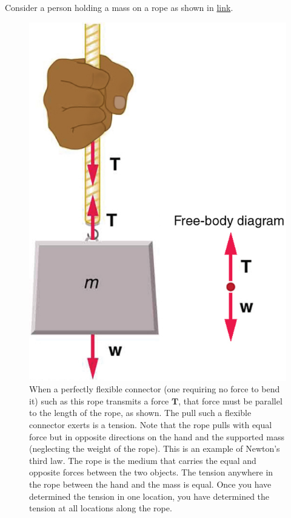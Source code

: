 \documentclass[
]{book}
\begin{document}
Consider a person holding a mass on a rope as shown in
\protect\hyperlink{import-auto-id2715102}{link}.

\begin{figure}
\hypertarget{import-auto-id2715102}{%
\centering
\includegraphics{images/Figure 04_05_04.jpg}
\caption{When a perfectly flexible connector (one requiring no force to bend
it) such as this rope transmits a force \(\textbf{T}{}\), that force must
be parallel to the length of the rope, as shown. The pull such a
flexible connector exerts is a tension. Note that the rope pulls with
equal force but in opposite directions on the hand and the supported
mass (neglecting the weight of the rope). This is an example of Newton's
third law. The rope is the medium that carries the equal and opposite
forces between the two objects. The tension anywhere in the rope between
the hand and the mass is equal. Once you have determined the tension in
one location, you have determined the tension at all locations along the
rope.}\label{import-auto-id2715102}
}
\end{figure}
\end{document}

